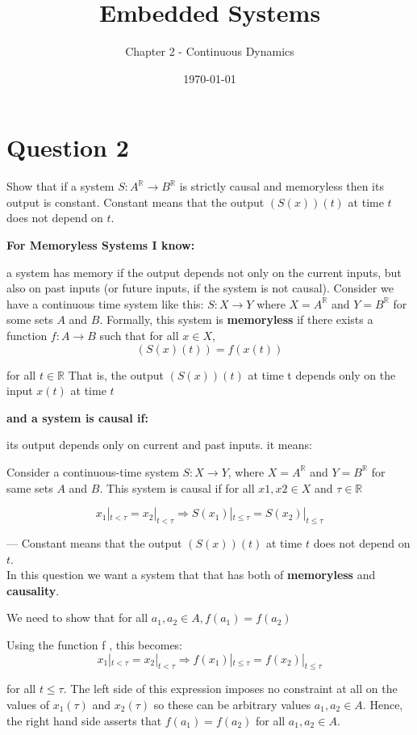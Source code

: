 \documentclass[12pt]{article}
\title{Embedded Systems}
\subtitle{Chapter 2 - Continuous Dynamics}
\date{\today}
\begin{document}
\maketitlepage
\maketitlestart

\section{Question 2}

Show that if a system $S: A^\mathbb{R} \rightarrow B^\mathbb{R}$ is strictly causal and memoryless then its output is constant. Constant means that the output $(S(x))(t)$ at time $t$ does not depend on $t$.


\begin{qsolve}[Solution]
	
	\textbf{For Memoryless Systems I know:}
	
	a system has memory if the output depends not only on the current inputs, but
	also on past inputs (or future inputs, if the system is not causal). Consider we have a continuous time system like this: $ S: X \rightarrow Y $ where $ X=A^\mathbb{R} $ and $Y=B^\mathbb{R}$ for some sets $A$ and $B$. Formally, this system is \textbf{memoryless} if there exists a function $f: A \rightarrow B$ such that for all $x \in X$, 
	$$ (S(x)(t))=f(x(t)) $$
	
	for all $t \in \mathbb{R}$ That is, the output $(S(x))(t)$ at time t depends only on the input $x(t)$ at time $t$
	
	
	\textbf{and a system is causal if:}
	
	its output depends only on current and past inputs. it means:
	
	Consider a continuous-time system $ S: X \rightarrow Y $, where $X=A^\mathbb{R}$ and $Y=B^\mathbb{R}$ for same sets $A$ and $B$. This system is causal if for all $x1, x2 \in X$ and $\tau \in \mathbb{R}$
	
	$$ x_1|_{t < \tau} = x_2|_{t < \tau} \Rightarrow S(x_1)|_{t \le \tau} = S(x_2)|_{t \le \tau}$$
	
	--- Constant means that the output $(S(x))(t)$ at time $t$ does not depend on $t$.\\
	In this question we want a system that that has both of \textbf{memoryless} and \textbf{causality}.
	
	We need to show that for all $a_1, a_2 \in A, f(a_1)=f(a_2)$
	
	Using the function f , this becomes:
	$$ x_1|_{t < \tau} = x_2|_{t < \tau} \Rightarrow f(x_1)|_{t \le \tau} = f(x_2)|_{t \le \tau}$$
	
	for all $t\le \tau$. The left side of this expression imposes no constraint at all on the values of $x_1(\tau)$ and $x_2(\tau)$ so these can be arbitrary values $a_1, a_2 \in A$. Hence, the right hand side asserts that $f(a_1) = f (a_2)$ for all $a_1, a_2 \in A$.
	
	
\end{qsolve}
\vfil
\clearpage
\end{document}
